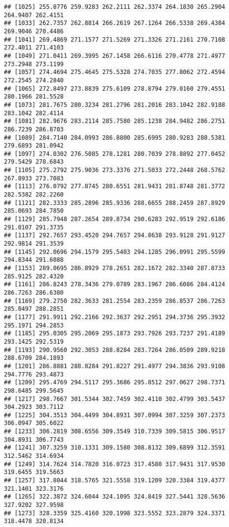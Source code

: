 \documentclass[
]{article}
\begin{document}
\begin{verbatim}
## [1025] 255.8776 259.9283 262.2111 262.3374 264.1830 265.2904 264.9407 262.4151
## [1033] 262.7357 262.8814 266.2619 267.1264 266.5338 269.4384 269.9046 270.4486
## [1041] 269.4869 271.1577 271.5269 271.3326 271.2161 270.7108 272.4011 271.4103
## [1049] 271.0411 269.3995 267.1458 266.6116 270.4778 271.4977 273.2948 273.1199
## [1057] 274.4694 275.4645 275.5328 274.7035 277.8062 272.4594 272.2545 274.2840
## [1065] 272.8497 273.8839 275.6109 278.8794 279.0160 279.4551 280.1966 281.5528
## [1073] 281.7675 280.3234 281.2796 281.2016 283.1042 282.9188 283.1042 282.4114
## [1081] 282.9676 283.2114 285.7580 285.1238 284.9482 286.2751 286.7239 286.8703
## [1089] 284.7140 284.0993 286.8800 285.6995 280.9283 280.5381 279.6893 281.0942
## [1097] 274.0302 276.5085 278.1281 280.7039 278.8892 277.0452 279.5429 278.6843
## [1105] 275.2792 275.9036 273.3376 271.5033 272.2448 268.5762 267.8933 273.7083
## [1113] 276.0792 277.8745 280.6551 281.9431 281.8748 281.3772 282.5382 282.2260
## [1121] 282.3333 285.2896 285.9336 288.6655 288.2459 287.8929 285.0693 284.7850
## [1129] 285.7948 287.2654 289.8734 290.6283 292.9519 292.6186 291.0107 291.3735
## [1137] 292.7657 293.4520 294.7657 294.8638 293.9128 291.9127 292.9814 291.3539
## [1145] 292.0696 294.1579 295.5403 294.1285 296.0991 295.5599 294.8344 291.6088
## [1153] 289.0695 286.8929 278.2651 282.1672 282.3340 287.8733 285.9125 282.4320
## [1161] 286.8243 278.3436 279.0789 283.1967 286.6086 284.4124 286.7263 286.6380
## [1169] 279.2750 282.3633 281.2554 283.2359 286.8537 286.7263 285.0497 288.2851
## [1177] 291.9911 292.2166 292.3637 292.2951 294.3736 295.3932 295.1971 294.2853
## [1185] 295.0305 295.2069 295.1873 293.7926 293.7237 291.4189 293.1425 292.5319
## [1193] 290.9560 292.3053 288.8284 283.7264 286.0509 289.9218 288.6709 284.1893
## [1201] 286.8881 288.8284 291.8227 291.4977 294.3836 293.9108 294.7776 293.4873
## [1209] 295.4769 294.5117 295.3686 295.8512 297.0627 298.7371 298.6485 299.5645
## [1217] 298.7667 301.5344 302.7459 302.4110 302.4799 303.5437 304.2923 303.7112
## [1225] 304.3513 304.4499 304.8931 307.0994 307.3259 307.2373 306.0947 305.6022
## [1233] 306.2819 308.6556 309.3549 310.7339 309.5815 306.9517 304.8931 306.7743
## [1241] 307.3259 310.1331 309.1580 308.8132 309.6899 312.3591 312.5462 314.6934
## [1249] 314.7624 314.7820 316.0723 317.4580 317.9431 317.9530 319.6455 319.5663
## [1257] 317.8044 318.5765 321.5558 319.1209 320.3384 319.4377 321.1401 323.3176
## [1265] 322.3872 324.6044 324.1095 324.8419 327.5441 328.5636 327.9202 327.9598
## [1273] 328.3359 325.4160 320.1998 323.5552 323.2879 324.3371 318.4478 320.8134

\end{verbatim}
\end{document}
